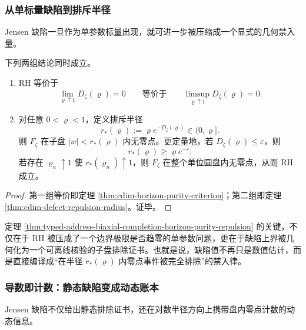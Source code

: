 \subsubsection{从单标量缺陷到排斥半径}\label{subsubsec:typed-address-biaxial-completion-jensen-defect-repulsion-radius}
Jensen 缺陷一旦作为单参数标量出现，就可进一步被压缩成一个显式的几何禁入量。

\begin{theorem}[视界纯度与排斥半径]\label{thm:typed-address-biaxial-completion-horizon-purity-repulsion}
下列两组结论同时成立。
\begin{enumerate}
  \item RH 等价于
  \[
  \lim_{\varrho\uparrow 1}D_{\zeta}(\varrho)=0
  \qquad\text{等价于}\qquad
  \limsup_{\varrho\uparrow 1}D_{\zeta}(\varrho)=0.
  \]
  \item 对任意 \(0<\varrho<1\)，定义排斥半径
  \[
  r_{\ast}(\varrho):=\varrho e^{-D_{\zeta}(\varrho)}\in(0,\varrho].
  \]
  则 \(F_{\zeta}\) 在子盘 \(|w|<r_{\ast}(\varrho)\) 内无零点。更定量地，若 \(D_{\zeta}(\varrho)\le \varepsilon\)，则
  \[
  r_{\ast}(\varrho)\ge \varrho e^{-\varepsilon}.
  \]
  若存在 \(\varrho_n\uparrow 1\) 使 \(r_{\ast}(\varrho_n)\uparrow 1\)，则 \(F_{\zeta}\) 在整个单位圆盘内无零点，从而 RH 成立。
\end{enumerate}
\end{theorem}
\begin{proof}
第一组等价即定理 \ref{thm:cdim-horizon-purity-criterion}；第二组即定理 \ref{thm:cdim-defect-repulsion-radius}。证毕。
\end{proof}

定理 \ref{thm:typed-address-biaxial-completion-horizon-purity-repulsion} 的关键，不仅在于 RH 被压成了一个边界极限是否趋零的单参数问题，更在于缺陷上界被几何化为一个可离线核验的子盘排除证书。也就是说，缺陷值不再只是数值估计，而是直接编译成“在半径 \(r_{\ast}(\varrho)\) 内零点事件被完全排除”的禁入律。

\subsubsection{导数即计数：静态缺陷变成动态账本}\label{subsubsec:typed-address-biaxial-completion-jensen-defect-log-derivative}
Jensen 缺陷不仅给出静态排除证书，还在对数半径方向上携带盘内零点计数的动态信息。

